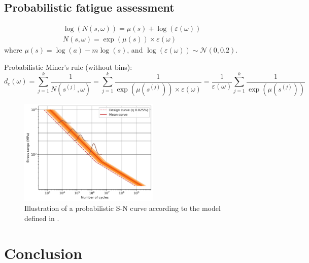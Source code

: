 \subsection{Probabilistic fatigue assessment}

\begin{align}
    \log(N(s, \omega)) = \mu(s) + \log(\varepsilon(\omega))\\
    N(s, \omega) = \exp(\mu(s)) \times \varepsilon(\omega)
\end{align}
where $\mu(s) = \log(a) - m \log(s)$, and $\log(\varepsilon(\omega)) \sim \mathcal{N}(0, 0.2)$. 

Probabilistic Miner's rule (without bins):
\begin{equation}
    d_c(\omega) = \sum_{j=1}^k \frac{1}{N(s^{(j)}, \omega)}
            = \sum_{j=1}^k \frac{1}{\exp(\mu(s^{(j)})) \times \varepsilon(\omega)}
            = \frac{1}{\varepsilon(\omega)} \sum_{j=1}^k \frac{1}{\exp(\mu(s^{(j)}))}
\end{equation}


\begin{figure}[h!]
    \centering
    \includegraphics[width=0.6\textwidth]{./part1/figures/probabilistic_fatigue.jpg}
    \caption{Illustration of a probabilistic S-N curve according to the model defined in \citet{guede_2007}.}
    \label{fig:probabilistic_SN}
\end{figure}


\section{Conclusion}
